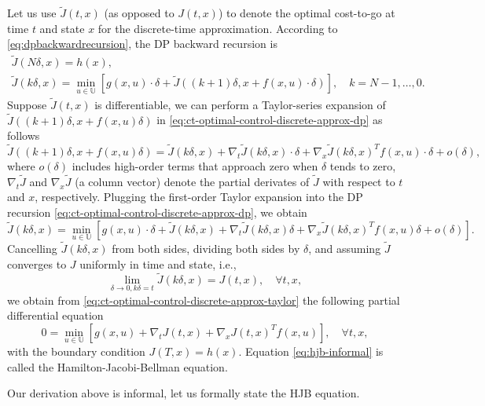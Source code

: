 \documentclass[
]{book}
\theoremstyle{definition}
\theoremstyle{definition}
\theoremstyle{definition}
\theoremstyle{definition}
\theoremstyle{remark}
\begin{document}
Let us use \(\tilde{J}(t,x)\) (as opposed to \(J(t,x)\)) to denote the optimal cost-to-go at time \(t\) and state \(x\) for the discrete-time approximation. According to \eqref{eq:dpbackwardrecursion}, the DP backward recursion is
\begin{align}
\tilde{J}(N\delta,x) = h(x), \\
\tilde{J}(k\delta,x) = \min_{u \in \mathbb{U}} \left[ g(x,u)\cdot \delta + \tilde{J}((k+1)\delta,x + f(x,u)\cdot \delta)  \right], \quad k = N-1,\dots,0.
\label{eq:ct-optimal-control-discrete-approx-dp}
\end{align}
Suppose \(\tilde{J}(t,x)\) is differentiable, we can perform a Taylor-series expansion of \(\tilde{J}((k+1)\delta,x+f(x,u)\delta)\) in \eqref{eq:ct-optimal-control-discrete-approx-dp} as follows
\[
\tilde{J}((k+1)\delta,x+f(x,u)\delta) = \tilde{J}(k\delta,x) + \nabla_t \tilde{J} (k\delta,x) \cdot \delta + \nabla_x \tilde{J}(k\delta,x)^T f(x,u) \cdot \delta + o(\delta),
\]
where \(o(\delta)\) includes high-order terms that approach zero when \(\delta\) tends to zero, \(\nabla_t \tilde{J}\) and \(\nabla_x \tilde{J}\) (a column vector) denote the partial derivates of \(\tilde{J}\) with respect to \(t\) and \(x\), respectively. Plugging the first-order Taylor expansion into the DP recursion \eqref{eq:ct-optimal-control-discrete-approx-dp}, we obtain
\begin{equation}
\tilde{J}(k\delta,x) = \min_{u \in \mathbb{U}} \left[ g(x,u) \cdot \delta + \tilde{J}(k \delta,x) + \nabla_t \tilde{J}(k \delta,x) \delta + \nabla_x \tilde{J}(k\delta,x)^T f(x,u) \delta + o(\delta)  \right].
\label{eq:ct-optimal-control-discrete-approx-taylor}
\end{equation}
Cancelling \(\tilde{J}(k \delta,x)\) from both sides, dividing both sides by \(\delta\), and assuming \(\tilde{J}\) converges to \(J\) uniformly in time and state, i.e.,
\[
\lim_{\delta \rightarrow 0, k\delta = t} \tilde{J}(k\delta,x) = J(t,x), \quad \forall t,x,
\]
we obtain from \eqref{eq:ct-optimal-control-discrete-approx-taylor} the following partial differential equation
\begin{equation}
0 = \min_{u \in \mathbb{U}} \left[ g(x,u) + \nabla_t J(t,x) + \nabla_x J(t,x)^T f(x,u)  \right], \quad \forall t, x,
\label{eq:hjb-informal}
\end{equation}
with the boundary condition \(J(T,x) = h(x)\). Equation \eqref{eq:hjb-informal} is called the Hamilton-Jacobi-Bellman equation.

Our derivation above is informal, let us formally state the HJB equation.
\end{document}
